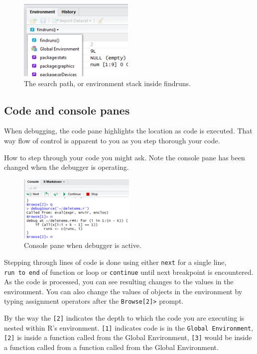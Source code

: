\documentclass[]{article}
\begin{document}
\begin{figure}
\centering
\includegraphics{envir-stack.png}
\caption{The search path, or environment stack inside findruns.}
\end{figure}

\subsection{Code and console panes}\label{code-and-console-panes}

When debugging, the code pane highlights the location as code is
executed. That way flow of control is apparent to you as you step
thorough your code.

How to step through your code you might ask. Note the console pane has
been changed when the debugger is operating.

\begin{figure}
\centering
\includegraphics{browse-console.png}
\caption{Console pane when debugger is active.}
\end{figure}

Stepping through lines of code is done using either \texttt{next} for a
single line, \texttt{run\ to\ end} of function or loop or
\texttt{continue} until next breakpoint is encountered. As the code is
processed, you can see resulting changes to the values in the
environment. You can also change the values of objects in the
environment by typing assignment operators after the
\texttt{Browse{[}2{]}\textgreater{}} prompt.

By the way the \texttt{{[}2{]}} indicates the depth to which the code
you are executing is nested within R's environment. \texttt{{[}1{]}}
indicates code is in the \texttt{Global\ Environment}, \texttt{{[}2{]}}
is inside a function called from the Global Environment,
\texttt{{[}3{]}} would be inside a function called from a function
called from the Global Environment.
\end{document}

